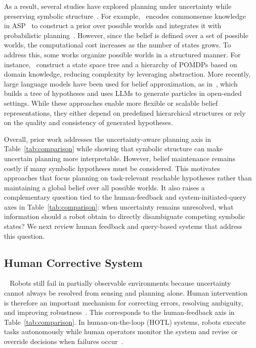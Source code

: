 As a result, several studies have explored planning under uncertainty while preserving symbolic structure~\cite{li2026uncertainty,sanner2010symbolic}. For example,~\cite{zhang2015corpp} encodes commonsense knowledge in ASP~\cite{lifschitz2019answer} to construct a prior over possible worlds and integrates it with probabilistic planning~\cite{kurniawati2008sarsop}. However, since the belief is defined over a set of possible worlds, the computational cost increases as the number of states grows. To address this, some works organize possible worlds in a structured manner. For instance,~\cite{serrano2021knowledge} construct a state space tree and a hierarchy of POMDPs based on domain knowledge, reducing complexity by leveraging abstraction. More recently, large language models have been used for belief approximation, as in~\cite{tang2025tru}, which builds a tree of hypotheses and uses LLMs to generate particles in open-ended settings. While these approaches enable more flexible or scalable belief representations, they either depend on predefined hierarchical structures or rely on the quality and consistency of generated hypotheses.


Overall, prior work addresses the uncertainty-aware planning axis in Table~\ref{tab:comparison} while showing that symbolic structure can make uncertain planning more interpretable. However, belief maintenance remains costly if many symbolic hypotheses must be considered. This motivates approaches that focus planning on task-relevant reachable hypotheses rather than maintaining a global belief over all possible worlds. It also raises a complementary question tied to the human-feedback and system-initiated-query axes in Table~\ref{tab:comparison}: when uncertainty remains unresolved, what information should a robot obtain to directly disambiguate competing symbolic states? We next review human feedback and query-based systems that address this question.



\subsection{Human Corrective System}~\label{rel:HCS}
Robots still fail in partially observable environments because uncertainty cannot always be resolved from sensing and planning alone. Human intervention is therefore an important mechanism for correcting errors, resolving ambiguity, and improving robustness~\cite{kelly2019hg,mandlekar2020human}. This corresponds to the human-feedback axis in Table~\ref{tab:comparison}. In human-on-the-loop (HOTL) systems, robots execute tasks autonomously while human operators monitor the system and revise or override decisions when failures occur~\cite{scharre2015introduction,nahavandi2017trusted}.

